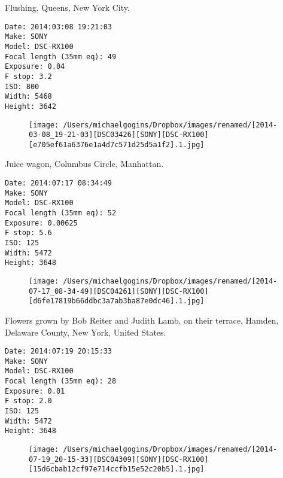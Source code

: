 \documentclass[11pt,letter,DIV=14,paper=landscape]{scrbook}
\begin{document}
\clearpage
\noindent Flushing, Queens, New York City.
\noindent
\begin{lstlisting}
Date: 2014:03:08 19:21:03
Make: SONY
Model: DSC-RX100
Focal length (35mm eq): 49
Exposure: 0.04
F stop: 3.2
ISO: 800
Width: 5468
Height: 3642
\end{lstlisting}
\clearpage

\begin{figure}
\texttt{[image: /Users/michaelgogins/Dropbox/images/renamed/[2014-03-08\_19-21-03][DSC03426][SONY][DSC-RX100][e705ef61a6376e1a4d7c571d25d5a1f2].1.jpg]}
\end{figure}
    
\clearpage
\noindent Juice wagon, Columbus Circle, Manhattan.
\noindent
\begin{lstlisting}
Date: 2014:07:17 08:34:49
Make: SONY
Model: DSC-RX100
Focal length (35mm eq): 52
Exposure: 0.00625
F stop: 5.6
ISO: 125
Width: 5472
Height: 3648
\end{lstlisting}
\clearpage

\begin{figure}
\texttt{[image: /Users/michaelgogins/Dropbox/images/renamed/[2014-07-17\_08-34-49][DSC04261][SONY][DSC-RX100][d6fe17819b66ddbc3a7ab3ba87e0dc46].1.jpg]}
\end{figure}
    
\clearpage
\noindent Flowers grown by Bob Reiter and Judith Lamb, on their terrace, Hamden, Delaware County, New York, United States.
\noindent
\begin{lstlisting}
Date: 2014:07:19 20:15:33
Make: SONY
Model: DSC-RX100
Focal length (35mm eq): 28
Exposure: 0.01
F stop: 2.0
ISO: 125
Width: 5472
Height: 3648
\end{lstlisting}
\clearpage

\begin{figure}
\texttt{[image: /Users/michaelgogins/Dropbox/images/renamed/[2014-07-19\_20-15-33][DSC04309][SONY][DSC-RX100][15d6cbab12cf97e714ccfb15e52c20b5].1.jpg]}
\end{figure}
    
\end{document}
